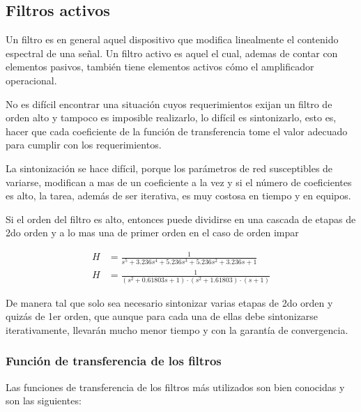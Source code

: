 \subsection{Filtros activos}

Un filtro es en general aquel dispositivo que modifica linealmente el
contenido espectral de una señal. Un filtro activo es aquel el cual, ademas de contar con elementos pasivos, también tiene elementos activos cómo el amplificador operacional.

No es difícil encontrar una situación cuyos requerimientos exijan un filtro de orden alto y tampoco es imposible realizarlo, lo difícil es sintonizarlo, esto es, hacer que cada coeficiente de la función de transferencia tome el valor adecuado para cumplir con los requerimientos.

La sintonización se hace difícil, porque los parámetros de red susceptibles de variarse, modifican a mas de un coeficiente a la vez y si el número de coeficientes es alto, la tarea, además de ser iterativa, es muy costosa en tiempo y en equipos.

Si el orden del filtro es alto, entonces puede dividirse en una cascada de etapas de 2do orden y a lo mas una de primer orden en el caso de orden impar

\begin{align*}
    H &= \frac{1}{s^5 + 3.236s^4 + 5.236s^3 + 5.236s^2 + 3.236s + 1} \\
    H &= \frac{1}{(s^2 + 0.61803s + 1) \cdot (s^2 + 1.61803) \cdot (s + 1)}
\end{align*}

De manera tal que solo sea necesario sintonizar varias etapas de 2do orden y quizás de 1er orden, que aunque para cada una de ellas debe sintonizarse iterativamente, llevarán mucho menor tiempo y con la garantía de convergencia.

\subsubsection{Función de transferencia de los filtros}

Las funciones de transferencia de los filtros más utilizados son bien conocidas y son las siguientes:

